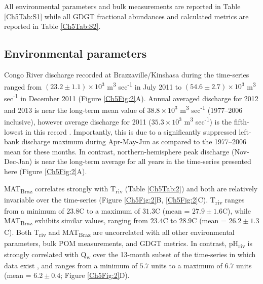 All environmental parameters and bulk measurements are reported in Table \ref{Ch5Tab:S1} while all GDGT fractional abundances and calculated metrics are reported in Table \ref{Ch5Tab:S2}. 

\subsection{Environmental parameters}

Congo River discharge recorded at Brazzaville/Kinshasa during the time-series ranged from $(23.2 \pm 1.1) \times 10^3$ m\textsuperscript{3} sec\textsuperscript{-1} in July 2011 to $(54.6 \pm 2.7) \times 10^3$ m\textsuperscript{3} sec\textsuperscript{-1} in December 2011 (Figure \ref{Ch5Fig:2}A). Annual averaged discharge for 2012 and 2013 is near the long-term mean value of $38.8 \times 10^3$ m\textsuperscript{3} sec\textsuperscript{-1} (1977--2006 inclusive), however average discharge for 2011 ($35.3 \times 10^3$ m\textsuperscript{3} sec\textsuperscript{-1}) is the fifth-lowest in this record \citep{Spencer:2012en}. Importantly, this is due to a significantly suppressed left-bank discharge maximum during Apr-May-Jun as compared to the 1977--2006 mean for these months. In contrast, northern-hemisphere peak discharge (Nov-Dec-Jan) is near the long-term average for all years in the time-series presented here (Figure \ref{Ch5Fig:2}A).

MAT\textsubscript{Braz} correlates strongly with T\textsubscript{riv} (Table \ref{Ch5Tab:2}) and both are relatively invariable over the time-series (Figure \ref{Ch5Fig:2}B, \ref{Ch5Fig:2}C). T\textsubscript{riv} ranges from a minimum of $23.8$\textdegree C to a maximum of $31.3$\textdegree C (mean = $27.9 \pm 1.6$\textdegree C), while MAT\textsubscript{Braz} exhibits similar values, ranging from $23.4$\textdegree C to $28.9$\textdegree C (mean = $26.2 \pm 1.3$\textdegree C). Both T\textsubscript{riv} and MAT\textsubscript{Braz} are uncorrelated with all other environmental parameters, bulk POM measurements, and GDGT metrics. In contrast, pH\textsubscript{riv} is strongly correlated with Q\textsubscript{w} over the 13-month subset of the time-series in which data exist \citep[$r = -0.97$, $p$-value = $1.25 \times 10^{-8}$;][]{Wang:2013js}, and ranges from a minimum of $5.7$ units to a maximum of $6.7$ units (mean = $6.2 \pm 0.4$; Figure \ref{Ch5Fig:2}D).

